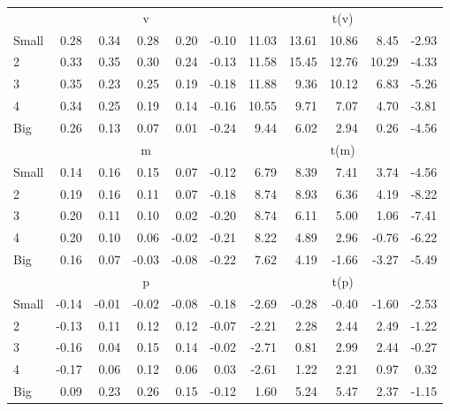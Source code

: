 \begin{table}[!ht]
\begin{tabular}{lrrrrrrrrrr}
  
     & \multicolumn{5}{c}{v} & \multicolumn{5}{c}{t(v)}   \\
     \cmidrule(r){2-6} \cmidrule(r){7-11} 
    Small  & 0.28  & 0.34  & 0.28  & 0.20  & -0.10  & 11.03  & 13.61  & 10.86  & 8.45  & -2.93   \\
    2  & 0.33  & 0.35  & 0.30  & 0.24  & -0.13  & 11.58  & 15.45  & 12.76  & 10.29  & -4.33   \\
    3  & 0.35  & 0.23  & 0.25  & 0.19  & -0.18  & 11.88  & 9.36  & 10.12  & 6.83  & -5.26   \\
    4  & 0.34  & 0.25  & 0.19  & 0.14  & -0.16  & 10.55  & 9.71  & 7.07  & 4.70  & -3.81   \\
    Big  & 0.26  & 0.13  & 0.07  & 0.01  & -0.24  & 9.44  & 6.02  & 2.94  & 0.26  & -4.56   \\
    
  
     & \multicolumn{5}{c}{m} & \multicolumn{5}{c}{t(m)}   \\
     \cmidrule(r){2-6} \cmidrule(r){7-11} 
    Small  & 0.14  & 0.16  & 0.15  & 0.07  & -0.12  & 6.79  & 8.39  & 7.41  & 3.74  & -4.56   \\
    2  & 0.19  & 0.16  & 0.11  & 0.07  & -0.18  & 8.74  & 8.93  & 6.36  & 4.19  & -8.22   \\
    3  & 0.20  & 0.11  & 0.10  & 0.02  & -0.20  & 8.74  & 6.11  & 5.00  & 1.06  & -7.41   \\
    4  & 0.20  & 0.10  & 0.06  & -0.02  & -0.21  & 8.22  & 4.89  & 2.96  & -0.76  & -6.22   \\
    Big  & 0.16  & 0.07  & -0.03  & -0.08  & -0.22  & 7.62  & 4.19  & -1.66  & -3.27  & -5.49   \\
    
  
     & \multicolumn{5}{c}{p} & \multicolumn{5}{c}{t(p)}   \\
     \cmidrule(r){2-6} \cmidrule(r){7-11} 
    Small  & -0.14  & -0.01  & -0.02  & -0.08  & -0.18  & -2.69  & -0.28  & -0.40  & -1.60  & -2.53   \\
    2  & -0.13  & 0.11  & 0.12  & 0.12  & -0.07  & -2.21  & 2.28  & 2.44  & 2.49  & -1.22   \\
    3  & -0.16  & 0.04  & 0.15  & 0.14  & -0.02  & -2.71  & 0.81  & 2.99  & 2.44  & -0.27   \\
    4  & -0.17  & 0.06  & 0.12  & 0.06  & 0.03  & -2.61  & 1.22  & 2.21  & 0.97  & 0.32   \\
    Big  & 0.09  & 0.23  & 0.26  & 0.15  & -0.12  & 1.60  & 5.24  & 5.47  & 2.37  & -1.15   \\
    
  
  \bottomrule
\end{tabular}
\label{tbl:25_Size_Beta_B16}
\end{table}
